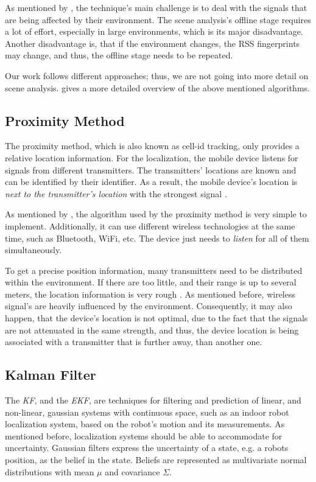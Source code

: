 As mentioned by \citet{IEEE:survey_wireless_indoor_pos}, the technique's main challenge is to deal with the signals that are being affected by their environment. The scene analysis's offline stage requires a lot of effort, especially in large environments, which is its major disadvantage. Another disadvantage is, that if the environment changes, the \acs{RSS} fingerprints may change, and thus, the offline stage needs to be repeated.

Our work follows different approaches; thus, we are not going into more detail on scene analysis. \citet{IEEE:survey_wireless_indoor_pos} gives a more detailed overview of the above mentioned algorithms.


\subsection{Proximity Method}
The proximity method, which is also known as cell-id tracking, only provides a relative location information. For the localization, the mobile device listens for signals from different transmitters. The transmitters' locations are known and can be identified by their identifier. As a result, the mobile device's location is \emph{next to the transmitter's location} with the strongest signal \citep{IEEE:survey_wireless_indoor_pos, wang:bt_pos}.

As mentioned by \citet{IEEE:survey_wireless_indoor_pos}, the algorithm used by the proximity method is very simple to implement. Additionally, it can use different wireless technologies at the same time, such as Bluetooth, WiFi, etc. The device just needs to \emph{listen} for all of them simultaneously. 

To get a precise position information, many transmitters need to be distributed within the environment. If there are too little, and their range is up to several meters, the location information is very rough \citep{kotanen:exp_local_pos_bt}. As mentioned before, wireless signal's are heavily influenced by the environment. Consequently, it may also happen, that the device's location is not optimal, due to the fact that the signals are not attenuated in the same strength, and thus, the device location is being associated with a transmitter that is further away, than another one.

\subsection{Kalman Filter}\label{sec:fund_kf}
The \emph{\ac{KF}}, and the \emph{\ac{EKF}}, are techniques for filtering and prediction of linear, and non-linear, gaussian systems with continuous space, such as an indoor robot localization system, based on the robot's motion and its measurements. As mentioned before, localization systems should be able to accommodate for uncertainty. Gaussian filters express the uncertainty of a state, e.g. a robots position, as the belief in the state. Beliefs are represented as multivariate normal distributions with mean $\mu$ and covariance $\Sigma$. %

